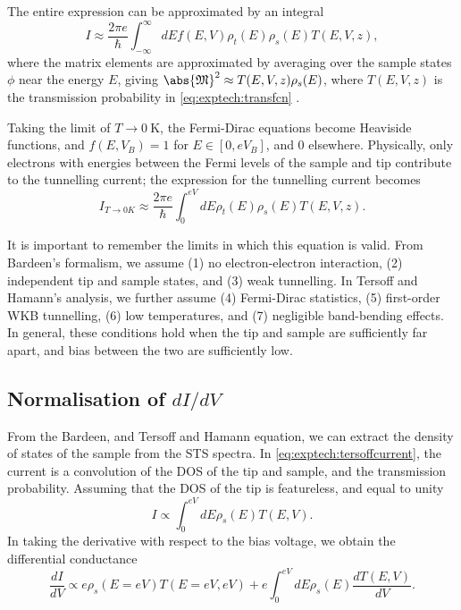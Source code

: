 The entire expression can be approximated by an integral
\begin{equation}
    I \approx \frac{2\pi e}{\hbar} \int_{-\infty}^\infty dE f(E,V) \rho_t(E)\rho_s(E) T(E,V,z),
\end{equation}
where the matrix elements are approximated by averaging over the sample states $\phi$ near the energy $E$, giving $\abs{\mathfrak{M}}^2 \approx T(E,V,z) \rho_s(E)$, where $T(E,V,z)$ is the transmission probability in \autoref{eq:exptech:transfcn} .

Taking the limit of $T \rightarrow \SI{0}{\kelvin}$, the Fermi-Dirac equations become Heaviside functions, and $f(E,V_B) = 1$ for $E \in [0,eV_B]$, and 0 elsewhere. Physically, only electrons with energies between the Fermi levels of the sample and tip contribute to the tunnelling current; the expression for the tunnelling current becomes
\begin{equation} \label{eq:exptech:tersoffcurrent}
I_{T \rightarrow 0K} \approx \frac{2\pi e}{\hbar} \int_{0} ^{eV} dE \rho_{t}(E) \rho_{s}(E) T(E,V,z).
\end{equation}

It is important to remember the limits in which this equation is valid. From Bardeen's formalism, we assume (1) no electron-electron interaction, (2) independent tip and sample states, and (3) weak tunnelling. In Tersoff and Hamann's analysis, we further assume (4) Fermi-Dirac statistics, (5) first-order \ac{WKB} tunnelling, (6) low temperatures, and (7) negligible band-bending effects. In general, these conditions hold when the tip and sample are sufficiently far apart, and bias between the two are sufficiently low.


\subsection{Normalisation of $dI/dV$}

From the Bardeen, and Tersoff and Hamann equation, we can extract the density of states of the sample from the \ac{STS} spectra. In \autoref{eq:exptech:tersoffcurrent}, the current is a convolution of the \ac{DOS} of the tip and sample, and the transmission probability. Assuming that the \ac{DOS} of the tip is featureless, and equal to unity
\begin{equation}
I \propto \int_0 ^{eV} dE \rho_s(E) T(E,V) .
\end{equation}
In taking the derivative with respect to the bias voltage, we obtain the differential conductance
\begin{equation} \label{eq:exptech:didv}
\frac{dI}{dV} \propto e \rho_s(E=eV) T(E=eV,eV) + e \int_0^{eV} dE \rho_s(E) \frac{dT(E,V)}{dV}  .
\end{equation}

